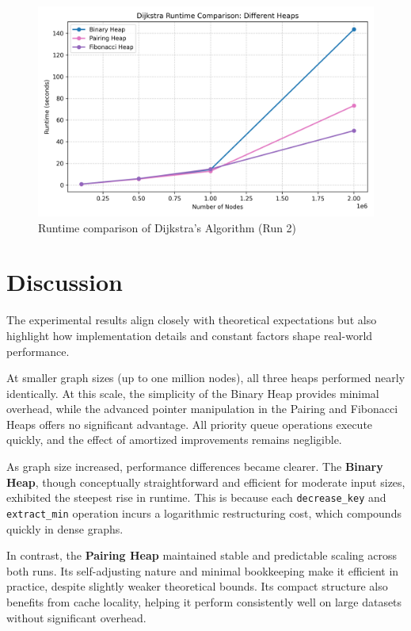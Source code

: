 \documentclass[acmsmall]{acmart}
\begin{document}
\begin{figure}[H]
  \centering
  \includegraphics[width=0.8\linewidth]{figs/runtime_comparison2.png}
  \caption{Runtime comparison of Dijkstra’s Algorithm (Run 2)}
  \label{fig:runtime2}
\end{figure}

\section{Discussion}
The experimental results align closely with theoretical expectations but also highlight how implementation details and constant factors shape real-world performance.

\vspace{1em}
At smaller graph sizes (up to one million nodes), all three heaps performed nearly identically. At this scale, the simplicity of the Binary Heap provides minimal overhead, while the advanced pointer manipulation in the Pairing and Fibonacci Heaps offers no significant advantage. All priority queue operations execute quickly, and the effect of amortized improvements remains negligible.

As graph size increased, performance differences became clearer. The \textbf{Binary Heap}, though conceptually straightforward and efficient for moderate input sizes, exhibited the steepest rise in runtime. This is because each \texttt{decrease\_key} and \texttt{extract\_min} operation incurs a logarithmic restructuring cost, which compounds quickly in dense graphs.

In contrast, the \textbf{Pairing Heap} maintained stable and predictable scaling across both runs. Its self-adjusting nature and minimal bookkeeping make it efficient in practice, despite slightly weaker theoretical bounds. Its compact structure also benefits from cache locality, helping it perform consistently well on large datasets without significant overhead.
\end{document}
